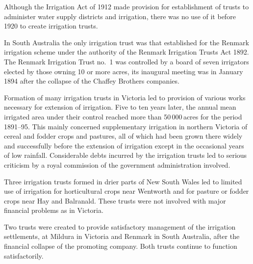 Although the Irrigation Act of 1912 made provision for establishment
of trusts to administer water supply districts and irrigation, there
was no use of it before 1920 to create irrigation trusts.

In South Australia the only irrigation trust was that established for
the Renmark  irrigation scheme under the authority
of the Renmark Irrigation Trusts Act  1892.  The Renmark Irrigation Trust no.~1
 was
controlled by a board of seven irrigators elected by those owning 10
or more acres, its inaugural meeting was in January 1894 after the
collapse of the Chaffey Brothers
companies.

\closure
Formation of many irrigation trusts in Victoria led to provision of
various works necessary for extension of irrigation.  Five to ten
years later, the annual mean irrigated area under their control
reached more than 50\,000\,acres for the period 1891--95.  This mainly
concerned supplementary irrigation in northern Victoria of cereal and
fodder crops and pastures, all of which had been grown there widely
and successfully before the extension of irrigation except in the
occasional years of low rainfall.  Considerable debts incurred by the
irrigation trusts led to serious criticism by a royal commission of
the government administration involved.

Three irrigation trusts formed in drier parts of New South Wales led
to limited use of irrigation for horticultural crops near Wentworth
and for pasture or fodder crops near Hay and Balranald.  These trusts
were not involved with major financial problems as in Victoria.

Two trusts were created to provide satisfactory management of the
irrigation settlements, at Mildura in Victoria and Renmark in South
Australia, after the financial collapse of the promoting company.
Both trusts continue to function satisfactorily.

